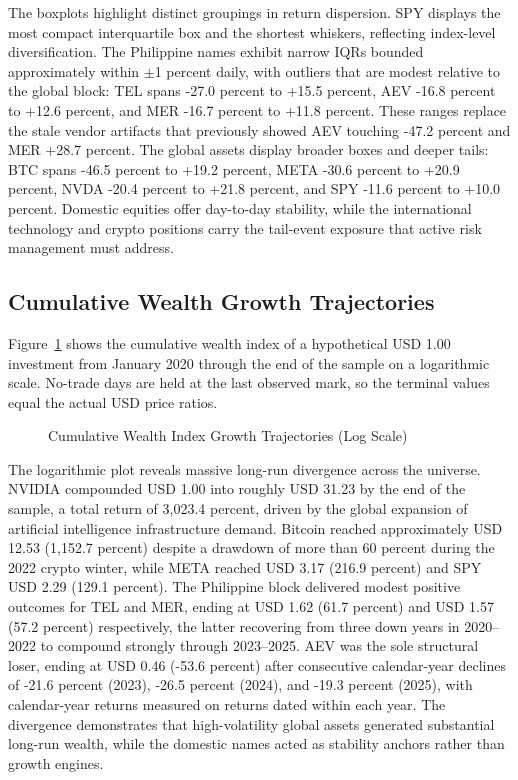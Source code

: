 The boxplots highlight distinct groupings in return dispersion. SPY displays the most compact interquartile box and the shortest whiskers, reflecting index-level diversification. The Philippine names exhibit narrow IQRs bounded approximately within $\pm$1 percent daily, with outliers that are modest relative to the global block: TEL spans -27.0 percent to +15.5 percent, AEV -16.8 percent to +12.6 percent, and MER -16.7 percent to +11.8 percent. These ranges replace the stale vendor artifacts that previously showed AEV touching -47.2 percent and MER +28.7 percent. The global assets display broader boxes and deeper tails: BTC spans -46.5 percent to +19.2 percent, META -30.6 percent to +20.9 percent, NVDA -20.4 percent to +21.8 percent, and SPY -11.6 percent to +10.0 percent. Domestic equities offer day-to-day stability, while the international technology and crypto positions carry the tail-event exposure that active risk management must address.

\subsection{Cumulative Wealth Growth Trajectories}

Figure~\ref{fig:cum_returns} shows the cumulative wealth index of a hypothetical USD 1.00 investment from January 2020 through the end of the sample on a logarithmic scale. No-trade days are held at the last observed mark, so the terminal values equal the actual USD price ratios.

\begin{figure}[H]
  \centering
  \caption{Cumulative Wealth Index Growth Trajectories (Log Scale)}
  \label{fig:cum_returns}
\end{figure}

The logarithmic plot reveals massive long-run divergence across the universe. NVIDIA compounded USD 1.00 into roughly USD 31.23 by the end of the sample, a total return of 3,023.4 percent, driven by the global expansion of artificial intelligence infrastructure demand. Bitcoin reached approximately USD 12.53 (1,152.7 percent) despite a drawdown of more than 60 percent during the 2022 crypto winter, while META reached USD 3.17 (216.9 percent) and SPY USD 2.29 (129.1 percent). The Philippine block delivered modest positive outcomes for TEL and MER, ending at USD 1.62 (61.7 percent) and USD 1.57 (57.2 percent) respectively, the latter recovering from three down years in 2020--2022 to compound strongly through 2023--2025. AEV was the sole structural loser, ending at USD 0.46 (-53.6 percent) after consecutive calendar-year declines of -21.6 percent (2023), -26.5 percent (2024), and -19.3 percent (2025), with calendar-year returns measured on returns dated within each year. The divergence demonstrates that high-volatility global assets generated substantial long-run wealth, while the domestic names acted as stability anchors rather than growth engines.


